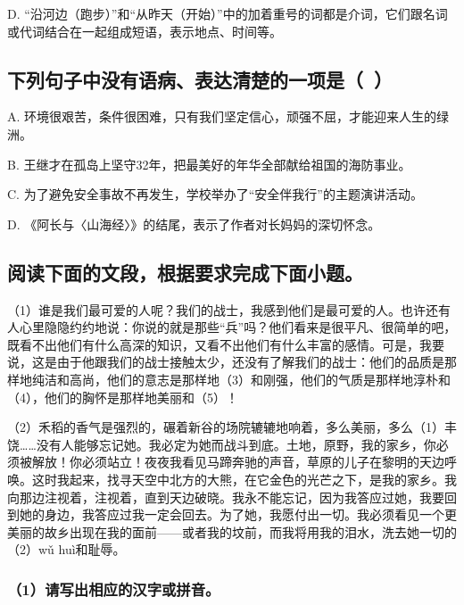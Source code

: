D. “沿河边（跑步）”和“从昨天（开始）”中的加着重号的词都是介词，它们跟名词或代词结合在一起组成短语，表示地点、时间等。



\subsection{下列句子中没有语病、表达清楚的一项是（\ ）}

A. 环境很艰苦，条件很困难，只有我们坚定信心，顽强不屈，才能迎来人生的绿洲。

B. 王继才在孤岛上坚守32年，把最美好的年华全部献给祖国的海防事业。

C. 为了避免安全事故不再发生，学校举办了“安全伴我行”的主题演讲活动。

D. 《阿长与〈山海经〉》的结尾，表示了作者对长妈妈的深切怀念。



\subsection{阅读下面的文段，根据要求完成下面小题。}

（1）谁是我们最可爱的人呢？我们的战士，我感到他们是最可爱的人。也许还有人心里隐隐约约地说：你说的就是那些“兵”吗？他们看来是很平凡、很简单的吧，既看不出他们有什么高深的知识，又看不出他们有什么丰富的感情。可是，我要说，这是由于他跟我们的战士接触太少，还没有了解我们的战士：他们的品质是那样地纯洁和高尚，他们的意志是那样地（3）\underline{\hspace{2em}}和刚强，他们的气质是那样地淳朴和（4）\underline{\hspace{2em}}，他们的胸怀是那样地美丽和（5）\underline{\hspace{2em}}！

（2）禾稻的香气是强烈的，碾着新谷的场院辘辘地响着，多么美丽，多么（1）丰饶……没有人能够忘记她。我必定为她而战斗到底。土地，原野，我的家乡，你必须被解放！你必须站立！夜夜我看见马蹄奔驰的声音，草原的儿子在黎明的天边呼唤。这时我起来，找寻天空中北方的大熊，在它金色的光芒之下，是我的家乡。我向那边注视着，注视着，直到天边破晓。我永不能忘记，因为我答应过她，我要回到她的身边，我答应过我一定会回去。为了她，我愿付出一切。我必须看见一个更美丽的故乡出现在我的面前——或者我的坟前，而我将用我的泪水，洗去她一切的（2）wǔ huì和耻辱。

\subsubsection*{（1）请写出相应的汉字或拼音。}

